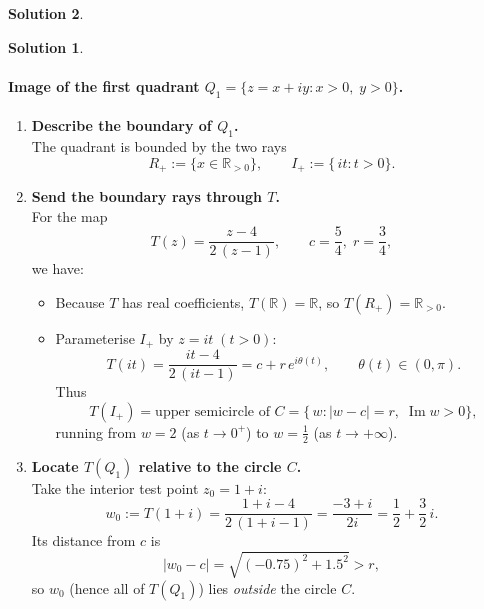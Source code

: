 \documentclass[12pt]{article}
\theoremstyle{definition} %
\newtheorem{solution}{Solution}
\theoremstyle{plain} %
\begin{document}
\begin{solution}
   \begin{solution}
      \paragraph{Image of the first quadrant \(Q_1=\{z=x+iy : x>0,\;y>0\}\).}
      
      \begin{enumerate}
        \item \textbf{Describe the boundary of \(Q_1\).}\\
              The quadrant is bounded by the two rays  
              \[
                  R_+ := \{x \in \mathbb{R}_{>0}\}, 
                  \qquad 
                  I_+ := \{\,it : t>0\}.
              \]
      
        \item \textbf{Send the boundary rays through \(T\).}\\
              For the map
              \[
                  T(z)=\frac{z-4}{2\,(z-1)}, 
                  \qquad 
                  c=\frac54,\; r=\frac34,
              \]
              we have:
              \begin{itemize}
                \item Because \(T\) has real coefficients, \(T(\mathbb{R})=\mathbb{R}\), so 
                      \(T(R_+)=\mathbb{R}_{>0}\).
                \item Parameterise \(I_+\) by \(z=it\;(t>0)\):
                      \[
                          T(it)=\frac{it-4}{2\,(it-1)}
                               =c + r \,e^{i\theta(t)}, 
                          \qquad \theta(t)\in(0,\pi).
                      \]
                      Thus
                      \[
                          T(I_+)=\text{upper semicircle of } C
                                 =\{\,w:|w-c|=r,\; \operatorname{Im}w>0\},
                      \]
                      running from \(w=2\) (as \(t\to0^+\)) to \(w=\tfrac12\) (as \(t\to+\infty\)).
              \end{itemize}
      
        \item \textbf{Locate \(T(Q_1)\) relative to the circle \(C\).}\\
              Take the interior test point \(z_0=1+i\):
              \[
                  w_0 := T(1+i)
                        =\frac{1+i-4}{2\,(1+i-1)}
                        =\frac{-3+i}{2i}
                        =\frac12+\frac32\,i.
              \]
              Its distance from \(c\) is
              \[
                  |w_0-c|
                    =\sqrt{(-0.75)^2 + 1.5^2}
                    > r,
              \]
              so \(w_0\) (hence all of \(T(Q_1)\)) lies \emph{outside} the circle \(C\).
      

\end{enumerate}
\end{solution}
\end{solution}
\end{document}
